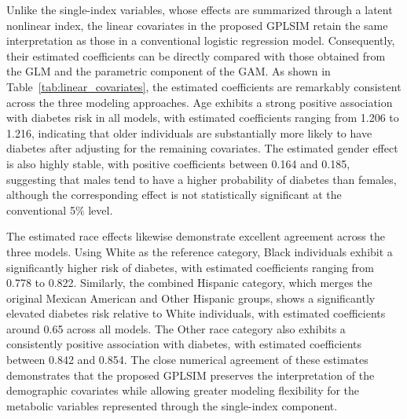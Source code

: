 Unlike the single-index variables, whose effects are summarized through a latent nonlinear index, the linear covariates in the proposed GPLSIM retain the same interpretation as those in a conventional logistic regression model. Consequently, their estimated coefficients can be directly compared with those obtained from the GLM and the parametric component of the GAM. As shown in Table~\ref{tab:linear_covariates}, the estimated coefficients are remarkably consistent across the three modeling approaches. Age exhibits a strong positive association with diabetes risk in all models, with estimated coefficients ranging from 1.206 to 1.216, indicating that older individuals are substantially more likely to have diabetes after adjusting for the remaining covariates. The estimated gender effect is also highly stable, with positive coefficients between 0.164 and 0.185, suggesting that males tend to have a higher probability of diabetes than females, although the corresponding effect is not statistically significant at the conventional 5\% level.

The estimated race effects likewise demonstrate excellent agreement across the three models. Using White as the reference category, Black individuals exhibit a significantly higher risk of diabetes, with estimated coefficients ranging from 0.778 to 0.822. Similarly, the combined Hispanic category, which merges the original Mexican American and Other Hispanic groups, shows a significantly elevated diabetes risk relative to White individuals, with estimated coefficients around 0.65 across all models. The Other race category also exhibits a consistently positive association with diabetes, with estimated coefficients between 0.842 and 0.854. The close numerical agreement of these estimates demonstrates that the proposed GPLSIM preserves the interpretation of the demographic covariates while allowing greater modeling flexibility for the metabolic variables represented through the single-index component.


